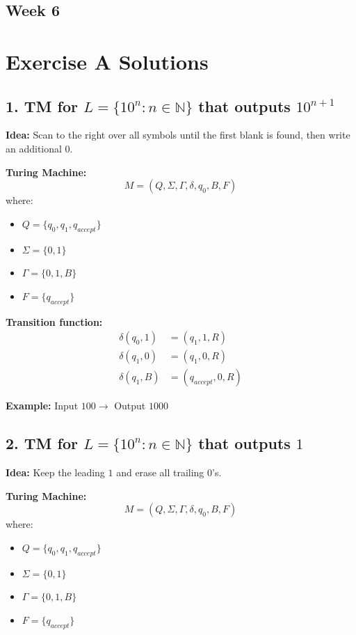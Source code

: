 \documentclass{article}
\theoremstyle{theorem}
\theoremstyle{definition}
\theoremstyle{remark}
\begin{document}
\subsection{Week 6}
\section*{Exercise A Solutions}

\subsection*{1. TM for $L = \{1 0^n : n \in \mathbb{N}\}$ that outputs $1 0^{n+1}$}

\textbf{Idea:} Scan to the right over all symbols until the first blank is found, then write an additional $0$.

\textbf{Turing Machine:}
\[
M = (Q, \Sigma, \Gamma, \delta, q_0, B, F)
\]
where:
\begin{itemize}
    \item $Q = \{q_0, q_1, q_{accept}\}$
    \item $\Sigma = \{0,1\}$
    \item $\Gamma = \{0,1,B\}$
    \item $F = \{q_{accept}\}$
\end{itemize}

\textbf{Transition function:}
\[
\begin{aligned}
\delta(q_0, 1) &= (q_1, 1, R) \\
\delta(q_1, 0) &= (q_1, 0, R) \\
\delta(q_1, B) &= (q_{accept}, 0, R)
\end{aligned}
\]

\textbf{Example:} Input $100 \rightarrow$ Output $1000$

\bigskip

\subsection*{2. TM for $L = \{1 0^n : n \in \mathbb{N}\}$ that outputs $1$}

\textbf{Idea:} Keep the leading $1$ and erase all trailing $0$'s.

\textbf{Turing Machine:}
\[
M = (Q, \Sigma, \Gamma, \delta, q_0, B, F)
\]
where:
\begin{itemize}
    \item $Q = \{q_0, q_1, q_{accept}\}$
    \item $\Sigma = \{0,1\}$
    \item $\Gamma = \{0,1,B\}$
    \item $F = \{q_{accept}\}$
\end{itemize}
\end{document}
